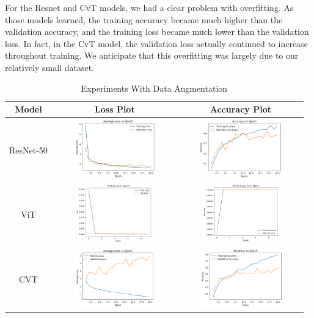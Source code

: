 \documentclass{article}
\begin{document}
For the Resnet and CvT models, we had a clear problem with overfitting. As those models learned, the training accuracy became much higher than the validation accuracy, and the training loss became much lower than the validation loss. In fact, in the CvT model, the validation loss actually continued to increase throughout training. We anticipate that this overfitting was largely due to our relatively small dataset.


\begin{table}[h!]
	\begin{center}
		\caption{Experiments With Data Augmentation}
		
		\begin{tabular}{|c|c|c|}
			\hline
			\rule{0pt}{20pt}
			\textbf{Model} &       \textbf{Loss Plot}       &     \textbf{Accuracy Plot}     \\ \hline
			\rule{0pt}{80pt}
			ResNet-50    & \includegraphics[width=2in, height = 1in]{7} & \includegraphics[width=2in, height = 1in]{8} \\ \hline
			\rule{0pt}{80pt}
			ViT       & \includegraphics[width=2in, height = 1in]{9} & \includegraphics[width=2in, height = 1in]{10} \\ \hline
			\rule{0pt}{80pt}
			CVT       & \includegraphics[width=2in, height = 1in]{11} & \includegraphics[width=2in, height = 1in]{12} \\ \hline
			

\end{tabular}
\end{center}
\end{table}
\end{document}
